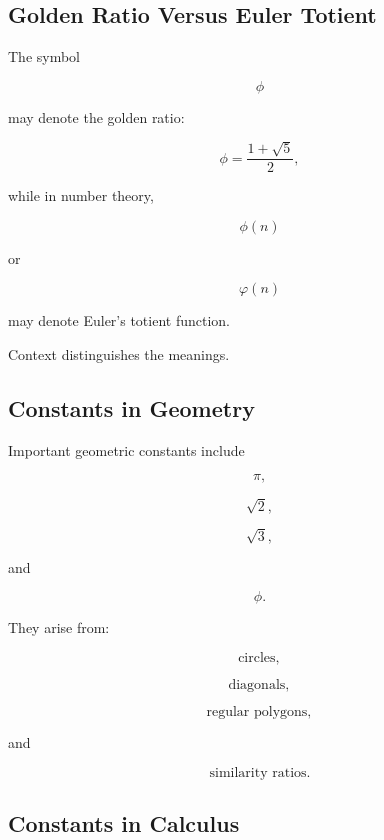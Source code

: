 \subsection{Golden Ratio Versus Euler Totient}
\label{subsec:phi-ambiguity-constants}

The symbol

\[
\phi
\]

may denote the golden ratio:

\[
\boxed{
\phi
=
\frac{1+\sqrt5}{2},
}
\]

while in number theory,

\[
\boxed{
\phi(n)
}
\]

or

\[
\boxed{
\varphi(n)
}
\]

may denote Euler's totient function.

Context distinguishes the meanings.

\subsection{Constants in Geometry}
\label{subsec:constants-in-geometry}

Important geometric constants include

\[
\boxed{
\pi,
}
\]

\[
\boxed{
\sqrt2,
}
\]

\[
\boxed{
\sqrt3,
}
\]

and

\[
\boxed{
\phi.
}
\]

They arise from:

\[
\boxed{
\text{circles},
}
\]

\[
\boxed{
\text{diagonals},
}
\]

\[
\boxed{
\text{regular polygons},
}
\]

and

\[
\boxed{
\text{similarity ratios}.
}
\]

\subsection{Constants in Calculus}
\label{subsec:constants-in-calculus}

